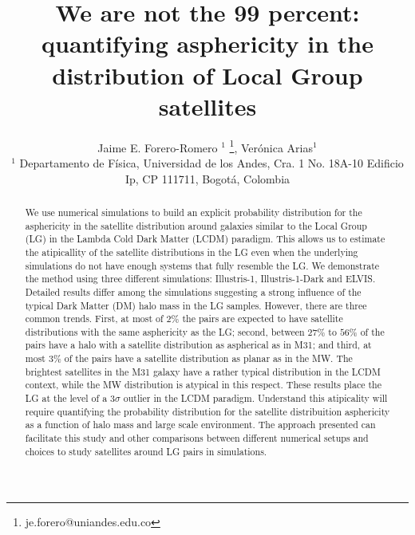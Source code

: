 \documentclass[a4paper,fleqn,usenatbib]{mnras}
\begin{document}
\title[LG satellites distribution asphericity]{We are not the 99 percent: quantifying
  asphericity in the distribution of Local Group satellites}
\author[J.E. Forero-Romero \& V. Arias]
{Jaime E. Forero-Romero $^{1}$ \thanks{je.forero@uniandes.edu.co},
Ver\'onica Arias$^1$\\
$^1$ Departamento de F\'isica, Universidad de los Andes, Cra. 1
  No. 18A-10 Edificio Ip, CP 111711, Bogot\'a, Colombia \\
}

\maketitle

\begin{abstract}
We use numerical simulations to build an explicit probability
distribution for the asphericity in the satellite distribution around
galaxies similar to the Local Group (LG) in the Lambda Cold Dark
Matter (LCDM) paradigm. 
This allows us to estimate the atipicallity
of the satellite distributions in the LG even when the underlying
simulations do not have enough systems that fully resemble the LG.
We demonstrate the method using three different simulations:
Illustris-1,  Illustris-1-Dark and ELVIS. 
Detailed results differ among the simulations suggesting a strong
influence of the typical Dark Matter (DM) halo mass in the LG samples.
However, there are three common trends.
First, at most of $2\%$ the pairs are expected to have satellite
distributions with the same asphericity as the LG; second,
between $27\%$ to $56\%$ of the pairs have a halo with a satellite
distribution as aspherical as in M31; and third, at most $3\%$ of the
pairs have a satellite distribution as planar as in the MW. 
The brightest satellites in the M31 galaxy have a rather typical
distribution in the LCDM context, while the MW distribution is
atypical in this respect.  
These results place the LG at the level of a $3\sigma$ outlier in the
LCDM paradigm. 
Understand this atipicality will require quantifying the probability
distribution for the satellite distribuition asphericity as a function
of halo mass and large scale environment. 
The approach presented can facilitate this study and other comparisons
between different numerical setups and choices to study satellites
around LG pairs in simulations.  
\end{abstract}
\end{document}
